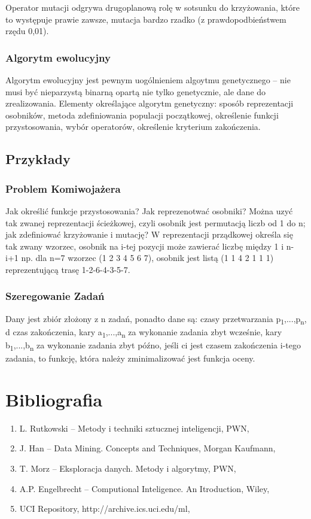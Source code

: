 \documentclass[runningheads,a4paper]{llncs}
\begin{document}
Operator mutacji odgrywa drugoplanową rolę w sotsunku do krzyżowania, które to występuje prawie zawsze, mutacja bardzo rzadko (z prawdopodbieństwem rzędu 0,01).

\subsubsection{Algorytm ewolucyjny}
Algorytm ewolucyjny jest pewnym uogólnieniem algoytmu genetycznego – nie musi być nieparzystą binarną opartą nie tylko genetycznie, ale dane do zrealizowania. Elementy określające algorytm genetyczny: sposób reprezentacji osobników, metoda zdefiniowania populacji początkowej, określenie funkcji przystosowania, wybór operatorów, określenie kryterium zakończenia.

\subsection{Przykłady}
\subsubsection{Problem Komiwojażera}
Jak określić funkcje przystosowania? Jak reprezenotwać osobniki?
Można uzyć tak zwanej reprezentacji ścieżkowej, czyli osobnik jest permutacją liczb od 1 do n; jak zdefiniować krzyżowanie i mutację? W reprezentacji prządkowej określa się tak zwany wzorzec, osobnik na i-tej pozycji może zawierać liczbę między 1 i n-i+1 np. dla n=7 wzorzec (1 2 3 4 5 6 7), osobnik jest listą (1 1 4 2 1 1 1) reprezentującą trasę 1-2-6-4-3-5-7.

\subsubsection{Szeregowanie Zadań}
Dany jest zbiór złożony z n zadań, ponadto dane są: czasy przetwarzania p\textsubscript{1},...,p\textsubscript{n}, d czas zakończenia, kary a\textsubscript{1},...,a\textsubscript{n} za wykonanie zadania zbyt wcześnie, kary b\textsubscript{1},...,b\textsubscript{n} za wykonanie zadania zbyt późno, jeśli ci jest czasem zakończenia i-tego zadania, to funkcję, która należy zminimalizować jest funkcja oceny.
%
\newpage
%
\section{Bibliografia}
\begin{enumerate}
\item L. Rutkowski – Metody i techniki sztucznej inteligencji, PWN,
\item J. Han – Data Mining. Concepts and Techniques, Morgan Kaufmann,
\item T. Morz – Eksploracja danych. Metody i algorytmy, PWN,
\item A.P. Engelbrecht – Computional Inteligence. An Itroduction, Wiley,
\item UCI Repository, http://archive.ics.uci.edu/ml,
\end{enumerate}
\end{document}
